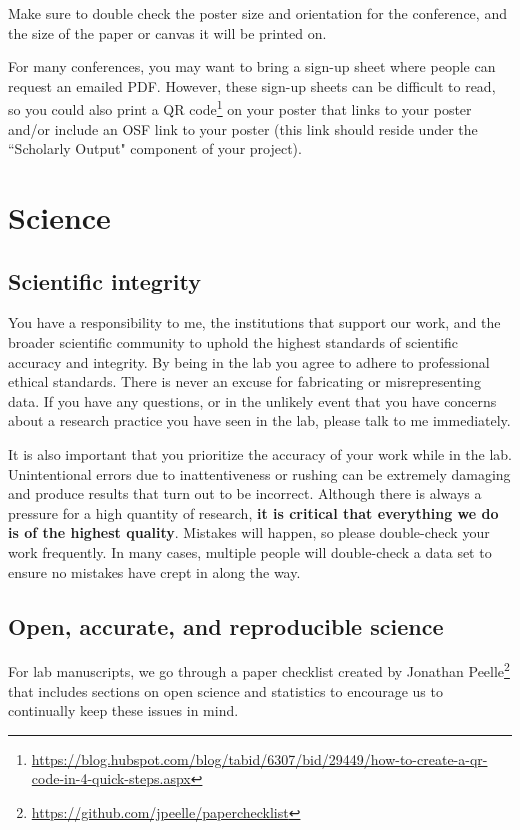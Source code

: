 \documentclass[letterpaper,12pt,oneside]{memoir}
\begin{document}
{Make sure to double check the poster size and orientation for the conference, and the size of the paper or canvas it will be printed on.

For many conferences, you may want to bring a sign-up sheet where people can request an emailed PDF. However, these sign-up sheets can be difficult to read, so you could also print a QR code\footnote{\url{https://blog.hubspot.com/blog/tabid/6307/bid/29449/how-to-create-a-qr-code-in-4-quick-steps.aspx}} on your poster that links to your poster and/or include an OSF link to your poster (this link should reside under the ``Scholarly Output" component of your project).



\chapter{Science}

\section{Scientific integrity}

You have a responsibility to me, the institutions that support our work, and the broader scientific community to uphold the highest standards of scientific accuracy and integrity. By being in the lab you agree to adhere to professional ethical standards. There is never an excuse for fabricating or misrepresenting data. If you have any questions, or in the unlikely event that you have concerns about a research practice you have seen in the lab, please talk to me immediately.

It is also important that you prioritize the accuracy of your work while in the lab. Unintentional errors due to inattentiveness or rushing can be extremely damaging and produce results that turn out to be incorrect. Although there is always a pressure for a high quantity of research, \textbf{it is critical that everything we do is of the highest quality}. Mistakes will happen, so please double-check your work frequently. In many cases, multiple people will double-check a data set to ensure no mistakes have crept in along the way.


\section{Open, accurate, and reproducible science}
\label{sec:openscience}

For lab manuscripts, we go through a paper checklist created by Jonathan Peelle\footnote{\url{https://github.com/jpeelle/paperchecklist}} that includes sections on open science and statistics to encourage us to continually keep these issues in mind.


}
\end{document}
